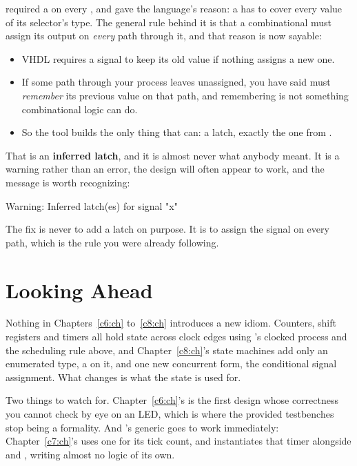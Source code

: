  required a  on every , and gave the language's reason: a
 has to cover every value of its selector's type. The general rule behind it is that a
combinational  must assign its output on \emph{every} path through it, and that
reason is now sayable:
\begin{itemize}
  \item VHDL requires a signal to keep its old value if nothing assigns a new one.
  \item If some path through your process leaves  unassigned, you have said  must
    \emph{remember} its previous value on that path, and remembering is not something combinational
    logic can do.
  \item So the tool builds the only thing that can: a latch, exactly the one from .
\end{itemize}
That is an \textbf{inferred latch}, and it is almost never what anybody meant. It is a warning
rather than an error, the design will often appear to work, and the message is worth recognizing:

\begin{console}
Warning: Inferred latch(es) for signal "x"
\end{console}

\noindent The fix is never to add a latch on purpose. It is to assign the signal on every path,
which is the rule you were already following.

\section{Looking Ahead}
\label{c5:a4}
Nothing in Chapters~\ref{c6:ch} to~\ref{c8:ch} introduces a new idiom. Counters, shift registers and
timers all hold state across clock edges using 's clocked process and the scheduling
rule above, and Chapter~\ref{c8:ch}'s state machines add only an enumerated type, a  on
it, and one new concurrent form, the conditional signal assignment. What changes is what the state
is used for.

Two things to watch for. Chapter~\ref{c6:ch}'s  is the first design whose
correctness you cannot check by eye on an LED, which is where the provided testbenches stop being a
formality. And 's generic goes to work immediately: Chapter~\ref{c7:ch}'s 
uses one for its tick count, and  instantiates that timer alongside
 and , writing almost no logic of its own.
